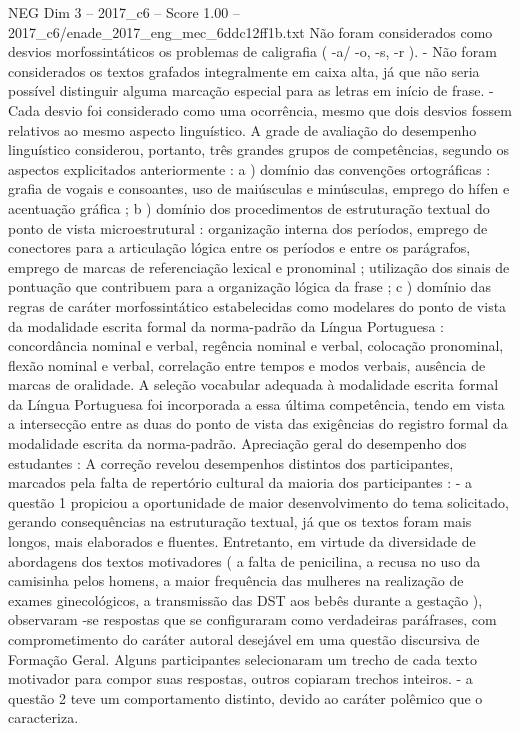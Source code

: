 \begin{textsample}{NEG Dim 3 – 2017\_c6 – Score 1.00 – 2017\_c6/enade\_2017\_eng\_mec\_6ddc12ff1b.txt}
Não foram considerados como desvios morfossintáticos os problemas de caligrafia ( -a/ -o, -s, -r ). - Não foram considerados os textos grafados integralmente em caixa alta, já que não seria possível distinguir alguma marcação especial para as letras em início de frase. - Cada desvio foi considerado como uma ocorrência, mesmo que dois desvios fossem relativos ao mesmo aspecto linguístico.
A grade de avaliação do desempenho linguístico considerou, portanto, três grandes grupos de competências, segundo os aspectos explicitados anteriormente : a ) domínio das convenções ortográficas : grafia de vogais e consoantes, uso de maiúsculas e minúsculas, emprego do hífen e acentuação gráfica ; b ) domínio dos procedimentos de estruturação textual do ponto de vista microestrutural : organização interna dos períodos, emprego de conectores para a articulação lógica entre os períodos e entre os parágrafos, emprego de marcas de referenciação lexical e pronominal ; utilização dos sinais de pontuação que contribuem para a organização lógica da frase ; c ) domínio das regras de caráter morfossintático estabelecidas como modelares do ponto de vista da modalidade escrita formal da norma-padrão da Língua Portuguesa : concordância nominal e verbal, regência nominal e verbal, colocação pronominal, flexão nominal e verbal, correlação entre tempos e modos verbais, ausência de marcas de oralidade.
A seleção vocabular adequada à modalidade escrita formal da Língua Portuguesa foi incorporada a essa última competência, tendo em vista a intersecção entre as duas do ponto de vista das exigências do registro formal da modalidade escrita da norma-padrão.
Apreciação geral do desempenho dos estudantes : A correção revelou desempenhos distintos dos participantes, marcados pela falta de repertório cultural da maioria dos participantes : - a questão 1 propiciou a oportunidade de maior desenvolvimento do tema solicitado, gerando consequências na estruturação textual, já que os textos foram mais longos, mais elaborados e fluentes.
Entretanto, em virtude da diversidade de abordagens dos textos motivadores ( a falta de penicilina, a recusa no uso da camisinha pelos homens, a maior frequência das mulheres na realização de exames ginecológicos, a transmissão das DST aos bebês durante a gestação ), observaram -se respostas que se configuraram como verdadeiras paráfrases, com comprometimento do caráter autoral desejável em uma questão discursiva de Formação Geral.
Alguns participantes selecionaram um trecho de cada texto motivador para compor suas respostas, outros copiaram trechos inteiros. - a questão 2 teve um comportamento distinto, devido ao caráter polêmico que o caracteriza.

\end{textsample}
